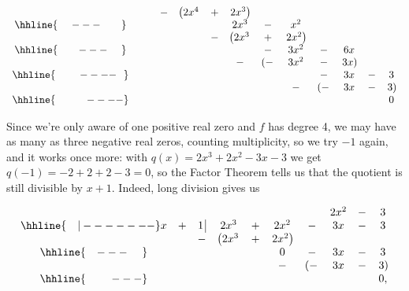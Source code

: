 {\begin{enumerate}
{\[\begin{array}{ccccccccccccc}
  &  &  &  -& \left(2x^4 \right.& + & \left.2x^3\right) &  &  &  &  &    \\ \hhline{~~~~---~~~~~~} 
  &  &  &   &    &   &  2x^3    & - & x^2 &  &  &  &  \\ 
  &  &  &   &    & - &  \left(2x^3\right. & +  & \left. 2x^2\right) & &  &  &     \\ 
\hhline{~~~~~~---~~~~} 
  &  &  &   &    &   &                    &  - & 3x^2 & - & 6x & & \\
  &  &  &   &    &   &                  - &\left(-\right. & 3x^2 & - & \left.3x\right) & & \\
 \hhline{~~~~~~~----~~}   
  &  &  &   &    &   &  &  &  & - & 3x & - &3 \\
  &  &  &   &    &   &  &  & - &\left(-\right. & 3x & - & \left.3\right)\\
 \hhline{~~~~~~~~~----}
  &  &  &   &    &   &  &  &   &               &    &   & 0 

 \end{array}\]
 
\setlength\arraycolsep{5pt}
\setlength\extrarowheight{0pt}

Since we're only aware of one positive real zero and $f$ has degree 4, we may have as many as three negative real zeros, counting multiplicity, so we try $-1$ again, and it works once more: with $q(x) = 2x^3+2x^2-3x-3$ we get $q(-1) = -2+2+2-3=0$, so the Factor Theorem tells us that the quotient is still divisible by $x+1$. Indeed, long division gives us 

\setlength\arraycolsep{0.1pt}
\setlength\extrarowheight{2pt}

\[ \begin{array}{cccccccccc}

& & & & & & & 2x^2 & - & 3 \\ \hhline{~~~|-------}

x & + & 1 \, \vline& 2x^3 & + & 2x^2 & - & 3x & - & 3\\

 &  &  -& \left(2x^3 \right. & + & \left.  2x^2\right) &  &  &  &  \\ \hhline{~~~---~~~~} 
 &  &  &   &   & 0 & - & 3x  & - & 3 \\ 
 &  &  &   &   & - & \left(-\right. & 3x & - & \left.3\right) \\  \hhline{~~~~~~~---} 
 &   &  &  &  &  &  &  &  & 0,
 
\end{array}\]

\setlength\arraycolsep{5pt}
\setlength\extrarowheight{0pt}

}
\end{enumerate}}

